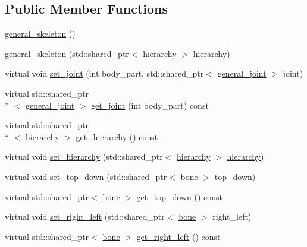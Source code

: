 \subsection*{Public Member Functions}
\begin{DoxyCompactItemize}
\item 
\hyperlink{classmae_1_1general__skeleton_a6fef617f6710635df357165f078b9c6f}{general\-\_\-skeleton} ()
\item 
\hyperlink{classmae_1_1general__skeleton_aa79f51739316055ff532e166efcd5055}{general\-\_\-skeleton} (std\-::shared\-\_\-ptr$<$ \hyperlink{classmae_1_1hierarchy}{hierarchy} $>$ \hyperlink{classmae_1_1hierarchy}{hierarchy})
\item 
virtual void \hyperlink{classmae_1_1general__skeleton_ac87486223ea33015136459e8d639c60f}{set\-\_\-joint} (int body\-\_\-part, std\-::shared\-\_\-ptr$<$ \hyperlink{classmae_1_1general__joint}{general\-\_\-joint} $>$ joint)
\item 
virtual std\-::shared\-\_\-ptr\\*
$<$ \hyperlink{classmae_1_1general__joint}{general\-\_\-joint} $>$ \hyperlink{classmae_1_1general__skeleton_a0fd825eaa52585b34d815ef67886b9eb}{get\-\_\-joint} (int body\-\_\-part) const 
\item 
virtual std\-::shared\-\_\-ptr\\*
$<$ \hyperlink{classmae_1_1hierarchy}{hierarchy} $>$ \hyperlink{classmae_1_1general__skeleton_a5455c3c36330399c724f36c477b70d06}{get\-\_\-hierarchy} () const 
\item 
virtual void \hyperlink{classmae_1_1general__skeleton_a3afe48d53ddf26630079ea414e7c953d}{set\-\_\-hierarchy} (std\-::shared\-\_\-ptr$<$ \hyperlink{classmae_1_1hierarchy}{hierarchy} $>$ \hyperlink{classmae_1_1hierarchy}{hierarchy})
\item 
virtual void \hyperlink{classmae_1_1general__skeleton_a9ff97c8b4e17d3dbe881b41485f225f7}{set\-\_\-top\-\_\-down} (std\-::shared\-\_\-ptr$<$ \hyperlink{classmae_1_1bone}{bone} $>$ top\-\_\-down)
\item 
virtual std\-::shared\-\_\-ptr$<$ \hyperlink{classmae_1_1bone}{bone} $>$ \hyperlink{classmae_1_1general__skeleton_a22e697fbaf293090c2a6802fbe803267}{get\-\_\-top\-\_\-down} () const 
\item 
virtual void \hyperlink{classmae_1_1general__skeleton_a276bc0e7dfdb7264bee13e90d9110d3c}{set\-\_\-right\-\_\-left} (std\-::shared\-\_\-ptr$<$ \hyperlink{classmae_1_1bone}{bone} $>$ right\-\_\-left)
\item 
virtual std\-::shared\-\_\-ptr$<$ \hyperlink{classmae_1_1bone}{bone} $>$ \hyperlink{classmae_1_1general__skeleton_a8e85feea644414851d7190e46ef84f13}{get\-\_\-right\-\_\-left} () const 

\end{DoxyCompactItemize}
